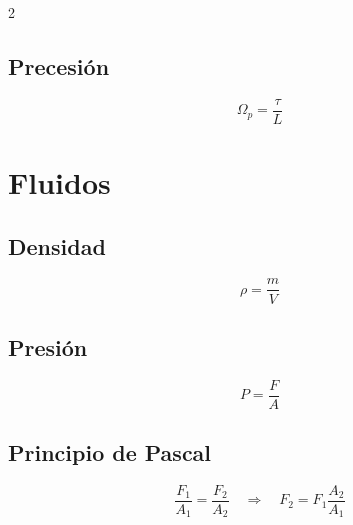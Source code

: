 \documentclass[10pt]{article}
\begin{document}
\begin{multicols}{2}
\subsection*{Precesión}
\[
\Omega_p = \frac{\tau}{L}
\]

\section*{Fluidos}

\subsection*{Densidad}
\[
\rho = \frac{m}{V}
\]

\subsection*{Presión}
\[
P = \frac{F}{A}
\]

\subsection*{Principio de Pascal}
\[
\frac{F_1}{A_1} = \frac{F_2}{A_2} \quad\Rightarrow\quad F_2 = F_1 \frac{A_2}{A_1}
\]

\end{multicols}
\end{document}
